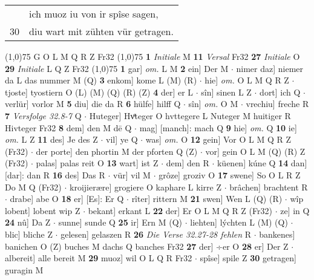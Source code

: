 \documentclass[8pt,a4paper,notitlepage]{article}
\begin{document}
\begin{table}[ht]
\begin{minipage}[t]{0.5\linewidth}
\begin{tabular}{rl}
 & ich muoz iu von ir spîse sagen,\\ 
30 & diu wart mit zühten vür getragen.\\ 
\end{tabular}
\scriptsize
\line(1,0){75} \newline
G O L M Q R Z Fr32 \newline
\line(1,0){75} \newline
\textbf{1} \textit{Initiale} M  \textbf{11} \textit{Versal} Fr32  \textbf{27} \textit{Initiale} O  \textbf{29} \textit{Initiale} L Q Z Fr32  \newline
\line(1,0){75} \newline
\textbf{1} gar] \textit{om.} L M \textbf{2} ein] Der M  $\cdot$ nimer daz] niemer da L das nummer M (Q) \textbf{3} enkom] kome L (M) (R)  $\cdot$ hie] \textit{om.} O L M Q R Z  $\cdot$ tjoste] tyostiern O (L) (M) (Q) (R) (Z) \textbf{4} der] er L  $\cdot$ sîn] sinen L Z  $\cdot$ dort] ich Q  $\cdot$ verlür] vorlor M \textbf{5} diu] die da R \textbf{6} hülfe] hilff Q  $\cdot$ sîn] \textit{om.} O M  $\cdot$ vrechiu] freche R \textbf{7} \textit{Versfolge 32.8-7} Q   $\cdot$ Huteger] Hvͤteger O hvttegere L Nuteger M huitiger R Hivteger Fr32 \textbf{8} dem] den M dē Q  $\cdot$ mag] [manch]: mach Q \textbf{9} hie] \textit{om.} Q \textbf{10} ie] \textit{om.} L Z \textbf{11} des] Je des Z  $\cdot$ vil] ye Q  $\cdot$ was] \textit{om.} O \textbf{12} gein] Vor O L M Q R Z (Fr32)  $\cdot$ der porte] den phortin M der pforten Q (Z)  $\cdot$ vor] gein O L M (Q) (R) Z (Fr32)  $\cdot$ palas] palas reit O \textbf{13} wart] ist Z  $\cdot$ dem] den R  $\cdot$ küenen] kúne Q \textbf{14} dan] [dar]: dan R \textbf{16} des] Das R  $\cdot$ vür] vil M  $\cdot$ grôze] groziv O \textbf{17} swene] So O L R Z Do M Q (Fr32)  $\cdot$ kroijierære] grogiere O kaphare L kirre Z  $\cdot$ brâchen] brachtent R  $\cdot$ drabe] abe O \textbf{18} er] [Es]: Er Q  $\cdot$ rîter] rittern M \textbf{21} swen] Wen L (Q) (R)  $\cdot$ wîp lobent] lobent wip Z  $\cdot$ bekant] erkant L \textbf{22} der] Er O L M Q R Z (Fr32)  $\cdot$ ze] in Q \textbf{24} nû] Da Z  $\cdot$ sunne] sunde Q \textbf{25} ir] Ern M (Q)  $\cdot$ liehten] lýchten L (M) (Q)  $\cdot$ blic] bliche Z  $\cdot$ gelesen] gelaszen R \textbf{26} \textit{Die Verse 32.27-28 fehlen} R   $\cdot$ bankenes] banichen O (Z) buches M dachs Q banches Fr32 \textbf{27} der] ÷er O \textbf{28} er] Der Z  $\cdot$ albereit] alle bereit M \textbf{29} muoz] wil O L Q R Fr32  $\cdot$ spîse] spile Z \textbf{30} getragen] guragin M \newline
\end{minipage}

\end{table}
\end{document}
